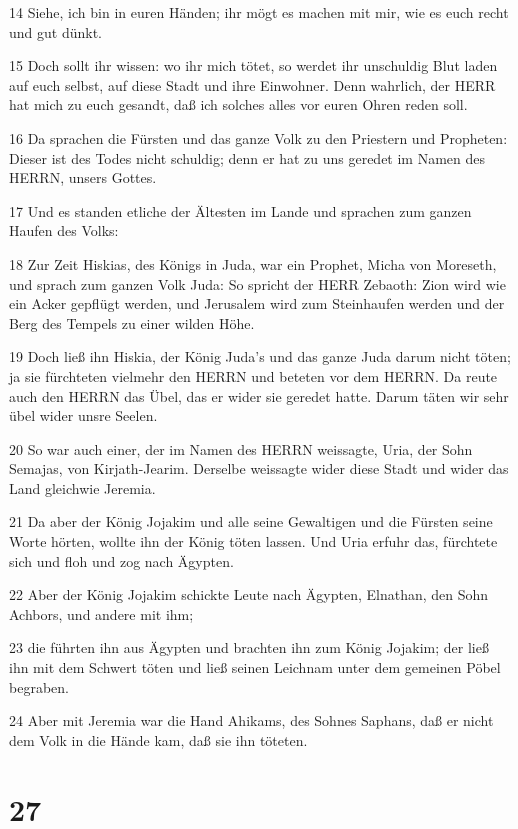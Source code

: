 \par 14 Siehe, ich bin in euren Händen; ihr mögt es machen mit mir, wie es euch recht und gut dünkt.
\par 15 Doch sollt ihr wissen: wo ihr mich tötet, so werdet ihr unschuldig Blut laden auf euch selbst, auf diese Stadt und ihre Einwohner. Denn wahrlich, der HERR hat mich zu euch gesandt, daß ich solches alles vor euren Ohren reden soll.
\par 16 Da sprachen die Fürsten und das ganze Volk zu den Priestern und Propheten: Dieser ist des Todes nicht schuldig; denn er hat zu uns geredet im Namen des HERRN, unsers Gottes.
\par 17 Und es standen etliche der Ältesten im Lande und sprachen zum ganzen Haufen des Volks:
\par 18 Zur Zeit Hiskias, des Königs in Juda, war ein Prophet, Micha von Moreseth, und sprach zum ganzen Volk Juda: So spricht der HERR Zebaoth: Zion wird wie ein Acker gepflügt werden, und Jerusalem wird zum Steinhaufen werden und der Berg des Tempels zu einer wilden Höhe.
\par 19 Doch ließ ihn Hiskia, der König Juda's und das ganze Juda darum nicht töten; ja sie fürchteten vielmehr den HERRN und beteten vor dem HERRN. Da reute auch den HERRN das Übel, das er wider sie geredet hatte. Darum täten wir sehr übel wider unsre Seelen.
\par 20 So war auch einer, der im Namen des HERRN weissagte, Uria, der Sohn Semajas, von Kirjath-Jearim. Derselbe weissagte wider diese Stadt und wider das Land gleichwie Jeremia.
\par 21 Da aber der König Jojakim und alle seine Gewaltigen und die Fürsten seine Worte hörten, wollte ihn der König töten lassen. Und Uria erfuhr das, fürchtete sich und floh und zog nach Ägypten.
\par 22 Aber der König Jojakim schickte Leute nach Ägypten, Elnathan, den Sohn Achbors, und andere mit ihm;
\par 23 die führten ihn aus Ägypten und brachten ihn zum König Jojakim; der ließ ihn mit dem Schwert töten und ließ seinen Leichnam unter dem gemeinen Pöbel begraben.
\par 24 Aber mit Jeremia war die Hand Ahikams, des Sohnes Saphans, daß er nicht dem Volk in die Hände kam, daß sie ihn töteten.

\chapter{27}

